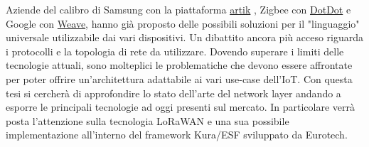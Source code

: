 Aziende del calibro di Samsung con la
piattaforma \href{https://www.artik.io}{artik}  , Zigbee con
\href{https://www.speakdotdot.com/dotdot/}{DotDot} e Google con
\href{https://developers.nest.com/weave/}{Weave}, hanno già proposto delle
possibili soluzioni per il "linguaggio" universale utilizzabile dai vari
dispositivi. Un dibattito ancora più acceso  riguarda i protocolli e la topologia di
rete da utilizzare. Dovendo superare i limiti delle tecnologie attuali, sono
molteplici le problematiche che devono essere affrontate per poter offrire un'architettura 
adattabile ai vari use-case dell'IoT.
Con questa tesi si cercherà di  approfondire lo stato dell'arte del network layer
andando a esporre le principali tecnologie ad oggi presenti sul mercato. In
particolare verrà posta l'attenzione sulla tecnologia LoRaWAN e una sua possibile
implementazione all'interno del framework Kura/ESF sviluppato da Eurotech.



